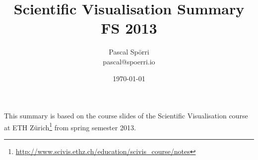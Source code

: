 \documentclass[a4paper]{scrartcl}
\author{Pascal Spörri\\pascal@spoerri.io}
\title{Scientific Visualisation Summary\\ FS 2013\\ }
\date{\today}
\begin{document}
\maketitle
This summary is based on the course slides of the Scientific Visualisation course at ETH Zürich\footnote{\url{http://www.scivis.ethz.ch/education/scivis_course/notes}} from spring semester 2013.
\newpage
\tableofcontents
\newpage

\newpage

\newpage

\newpage

\newpage

\newpage

\newpage

\newpage

\newpage

\end{document}
